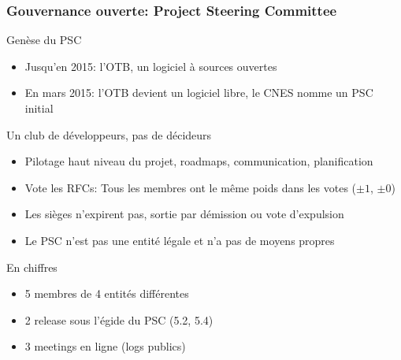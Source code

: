 \documentclass[8pt]{beamer}
\begin{document}
\begin{frame}
\frametitle{Gouvernance ouverte: Project Steering Committee}
\begin{block}{Genèse du PSC}
  \begin{itemize}
  \item Jusqu'en 2015: l'OTB, un logiciel à sources ouvertes
  \item En mars 2015: l'OTB devient un logiciel libre, le CNES nomme un PSC initial
  \end{itemize}
\end{block}
\begin{block}{Un club de développeurs, pas de décideurs}
  \begin{itemize}
  \item Pilotage haut niveau du projet, roadmaps, communication, planification
  \item Vote les RFCs: Tous les membres ont le même poids dans les votes ($\pm 1$, $\pm 0$)
  \item Les sièges n'expirent pas, sortie par démission ou vote d'expulsion
  \item Le PSC n'est pas une entité légale et n'a pas de moyens propres
  \end{itemize}
\end{block}
\begin{block}{En chiffres}
  \begin{itemize}
  \item 5 membres de 4 entités différentes
  \item 2 release sous l'égide du PSC (5.2, 5.4)
  \item 3 meetings en ligne (logs publics)
  \end{itemize}
\end{block}
\end{frame}
\end{document}
